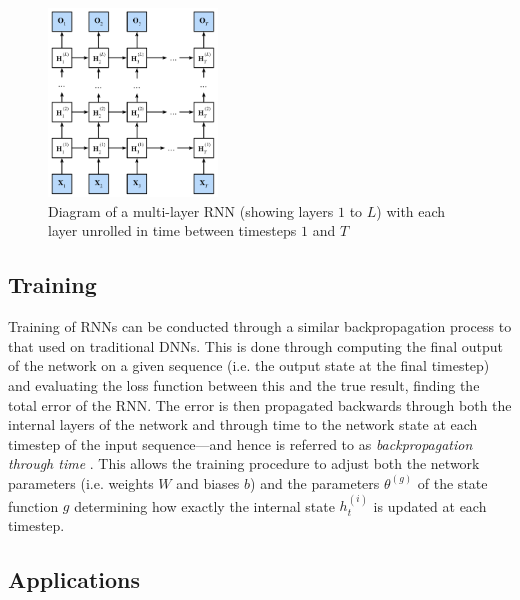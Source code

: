 \documentclass[a4paper, 11pt]{report}
\begin{document}
    \begin{figure}[ht]
        \label{fig: deep-rnn}
        \centering
        \includegraphics[width=0.4\textwidth]{deep-rnn.png}
        \caption{\centering Diagram of a multi-layer RNN (showing layers $1$ to $L$) with each layer unrolled in time between timesteps $1$ and $T$}
    \end{figure}


    \subsection{Training}

    Training of RNNs can be conducted through a similar backpropagation process to that used on traditional DNNs. This is done through computing the final output of the network on a given sequence (i.e. the output state at the final timestep) and evaluating the loss function between this and the true result, finding the total error of the RNN. The error is then propagated backwards through both the internal layers of the network and through time to the network state at each timestep of the input sequence---and hence is referred to as \emph{backpropagation through time} \citep{zhang-2021}. This allows the training procedure to adjust both the network parameters (i.e. weights $W$ and biases $b$) and the parameters $\theta^{(g)}$ of the state function $g$ determining how exactly the internal state $h^{(i)}_t$ is updated at each timestep.


    \subsection{Applications}
\end{document}
